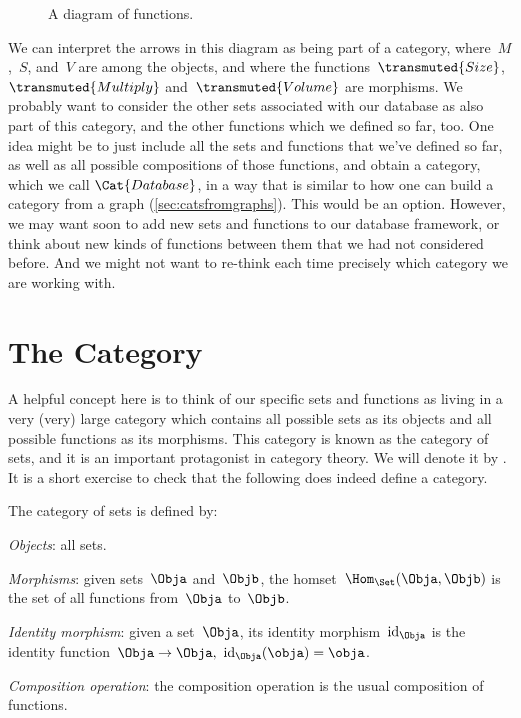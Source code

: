 

\begin{figure}[h!]
\begin{center}
\end{center}
\caption{A diagram of functions. \label{fig:diagram_functions}}
\end{figure}

We can interpret the arrows in this diagram as being part of a category, where~$M$,~$S$, and~$V$ are among the objects, and where the functions~$\transmuted{Size}$, $\transmuted{Multiply}$ and~$\transmuted{Volume}$ are morphisms. We probably want to consider the other sets associated with our database as also part of this category, and the other functions which we defined so far, too. One idea might be to just include all the sets and functions that we've defined so far, as well as all possible compositions of those functions, and obtain a category, which we call $\Cat{Database}$, in a way that is similar to how one can build a category from a graph (\cref{sec:catsfromgraphs}). This would be an option. However, we may want soon to add new sets and functions to our database framework, or think about new kinds of functions between them that we had not considered before. And we might not want to re-think each time precisely which category we are working with.

\section{The Category \Set}

A helpful concept here is to think of our specific sets and functions as living in a very (very) large category which contains all possible sets as its objects and all possible functions as its morphisms. This category is known as the category of sets, and it is an important protagonist in category theory. We will denote it by \Set. It is a short exercise to check that the following does indeed define a category.

\begin{ctdefinition}
The category of sets \Set is defined by:
    \begin{compactenum}
    \item \emph{Objects}: all sets.
    \item \emph{Morphisms}: given sets~$\Obja$ and~$\Objb$, the homset~$\Hom_\Set(\Obja,\Objb)$ is the set of all functions from~$\Obja$ to~$\Objb$.
    \item \emph{Identity morphism}: given a set~$\Obja$, its identity morphism~$\text{id}_\Obja$ is the identity function~$\Obja \to \Obja, \ \text{id}_\Obja(\obja) = \obja$.
    \item \emph{Composition operation}: the composition operation is the usual composition of functions.
    \end{compactenum}
\end{ctdefinition}

